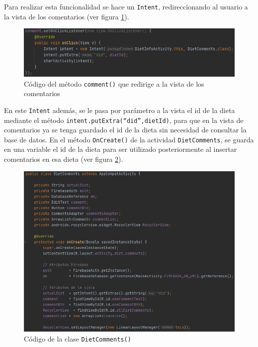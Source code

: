 Para realizar esta funcionalidad se hace un \texttt{Intent}, redireccionando al usuario a la vista de los comentarios (ver figura \ref{fig:commentcode}).

\begin{figure}[H]
    \centering
    \includegraphics[width=\textwidth]{Images/Capitulo7/commentcode.png}
        \caption{Código del método \texttt{comment()} que redirige a la vista de los comentarios}
    \label{fig:commentcode}
\end{figure}

En este \texttt{Intent} además, se le pasa por parámetro a la vista el id de la dieta mediante el método \texttt{intent.putExtra(“did”,dietId)}, para que en la vista de comentarios ya se tenga guardado el id de la dieta sin necesidad de consultar la base de datos.
En el método \texttt{OnCreate()}  de la actividad \texttt{DietComments}, se guarda en una variable el id de la dieta para ser utilizado posteriormente al insertar comentarios en esa dieta (ver figura \ref{fig:dietcomments}).

\begin{figure}[H]
    \centering
    \includegraphics[width=\textwidth]{Images/Capitulo7/dietcomments.png}
        \caption{Código de la clase \texttt{DietComments()}}
    \label{fig:dietcomments}
\end{figure}

